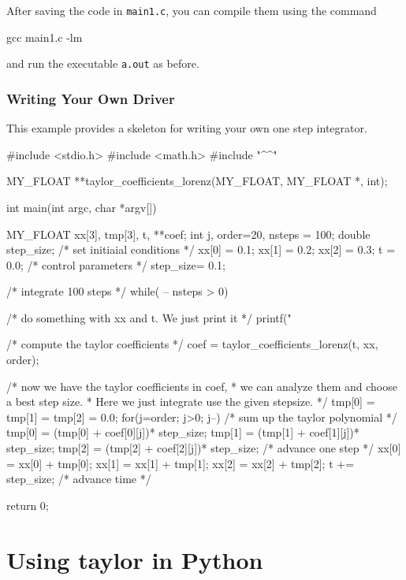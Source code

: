 \documentclass[10pt]{article}
\theoremstyle{remark}
\newcommand{\taylorname}{{\bf taylor}}
\newcommand{\odecfile}{}
\newcommand{\odehfile}{}
\begin{document}
\noindent
After saving the code in \verb+main1.c+, you can compile them using
the command
\begin{command}
   gcc \odecfile{} main1.c -lm
\end{command}
and run the executable \verb+a.out+ as before.


\subsubsection*{Writing Your Own Driver}

This example provides a skeleton for writing your own one step
integrator.

\begin{code}[title={File {\tt main2.c}}]
    #include <stdio.h>
    #include <math.h>
    #include "^\odehfile{}^"
    
    MY_FLOAT **taylor_coefficients_lorenz(MY_FLOAT, MY_FLOAT *, int);
    
    int main(int argc, char *argv[])
    {
       MY_FLOAT  xx[3], tmp[3], t, **coef;
       int       j, order=20, nsteps = 100;
       double    step_size;
       /* set initiaial conditions */
       xx[0] = 0.1;
       xx[1] = 0.2;
       xx[2] = 0.3;
       t     = 0.0;
       /* control parameters   */
       step_size= 0.1;
    
       /* integrate 100 steps */
       while( -- nsteps > 0) {
          /* do something with xx and t. We just print it */
          printf("%
    
          /* compute the taylor coefficients */
          coef = taylor_coefficients_lorenz(t, xx, order);
    
          /* now we have the taylor coefficients in coef,
           * we can analyze them and choose a best step size.
           * Here we just integrate use the given stepsize.
           */
           tmp[0] = tmp[1] = tmp[2] = 0.0;
           for(j=order; j>0; j--) /* sum up the taylor polynomial */
             { 
               tmp[0] = (tmp[0] + coef[0][j])* step_size;
               tmp[1] = (tmp[1] + coef[1][j])* step_size;
               tmp[2] = (tmp[2] + coef[2][j])* step_size;
             }
            /* advance one step */
            xx[0] = xx[0] + tmp[0];
            xx[1] = xx[1] + tmp[1];
            xx[2] = xx[2] + tmp[2];
            t += step_size; /* advance time */
         }
        return 0;
    }
\end{code}


\section{Using \taylorname{} in Python}
\end{document}

